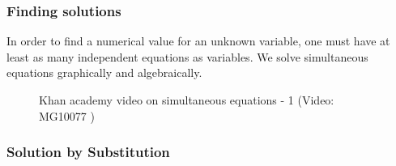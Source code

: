       
      \label{m39257*uid93}
            \subsubsection{ Finding solutions}
            \nopagebreak
            
        
        \label{m39257*id159052}In order to find a numerical value for an unknown variable, one must have at least as many independent equations as variables. We solve simultaneous equations graphically and algebraically.\par \label{m39257*eip-487}
    \setcounter{subfigure}{0}


	\begin{figure}[H] %
    
    
    \textnormal{Khan academy video on simultaneous equations - 1}\vspace{.1in} \nopagebreak
  \label{m39257*yt-media7}\label{m39257*yt-video7}
             { (Video:  MG10077 )}
      
      \vspace{2pt}
    \vspace{.1in}
    
    

 \end{figure}   

    \addtocounter{footnote}{-0}
    \par 

 \label{m39257*uid97}
            \subsubsection{ Solution by Substitution}
            \nopagebreak
            
